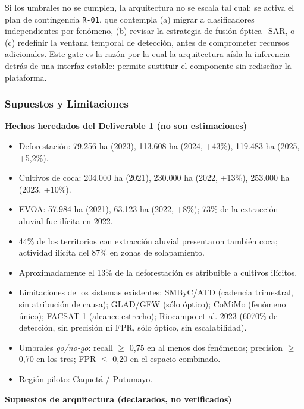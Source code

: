 \documentclass{article}
\newcommand{\mdhfour}[1]{\par\medskip\noindent\textbf{#1}\par\nobreak\smallskip}
\begin{document}
Si los umbrales no se cumplen, la arquitectura no se escala tal cual: se activa el plan de contingencia \texttt{R-\allowbreak{}01}, que contempla (a) migrar a clasificadores independientes por fenómeno, (b) revisar la estrategia de fusión óptica+SAR, o (c) redefinir la ventana temporal de detección, antes de comprometer recursos adicionales. Este gate es la razón por la cual la arquitectura aísla la inferencia detrás de una interfaz estable: permite sustituir el componente sin rediseñar la plataforma.

\subsubsection{Supuestos y Limitaciones}

\mdhfour{Hechos heredados del Deliverable 1 (no son estimaciones)}

\begin{itemize}
  \item Deforestación: 79.256 ha (2023), 113.608 ha (2024, +43\%), 119.483 ha (2025, +5,2\%).
  \item Cultivos de coca: 204.000 ha (2021), 230.000 ha (2022, +13\%), 253.000 ha (2023, +10\%).
  \item EVOA: 57.984 ha (2021), 63.123 ha (2022, +8\%); 73\% de la extracción aluvial fue ilícita en 2022.
  \item 44\% de los territorios con extracción aluvial presentaron también coca; actividad ilícita del 87\% en zonas de solapamiento.
  \item Aproximadamente el 13\% de la deforestación es atribuible a cultivos ilícitos.
  \item Limitaciones de los sistemas existentes: SMByC/ATD (cadencia trimestral, sin atribución de causa); GLAD/GFW (sólo óptico); CoMiMo (fenómeno único); FACSAT-1 (alcance estrecho); Riocampo et al. 2023 (60\textendash{}70\% de detección, sin precisión ni FPR, sólo óptico, sin escalabilidad).
  \item Umbrales \emph{go/no-go}: recall \ensuremath{\geq} 0,75 en al menos dos fenómenos; precision \ensuremath{\geq} 0,70 en los tres; FPR \ensuremath{\leq} 0,20 en el espacio combinado.
  \item Región piloto: Caquetá / Putumayo.
\end{itemize}

\mdhfour{Supuestos de arquitectura (declarados, no verificados)}
\end{document}
